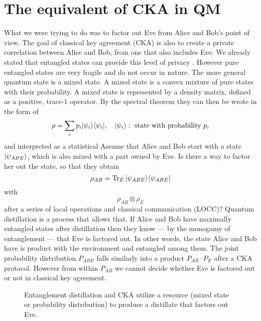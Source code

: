 	
    
\section{The equivalent of CKA in QM}
	What we were trying to do was to factor out Eve from Alice and Bob's point of view.
	The goal of classical key agreement (CKA) is also to create a private correlation between Alice and Bob, from one that also includes Eve.
	We already stated that entangled states can provide this level of privacy \cite{Ekert91}.
	However pure entangled states are very fragile and do not occur in nature.
	The more general quantum state is a mixed state.
	A mixed state is a convex mixture of pure states with their probability.
	A mixed state is represented by a density matrix, defined as a positive, trace-$1$ operator.
	By the spectral theorem they can then be wrote in the form of
	\begin{equation}
		\rho = \sum_i p_i |\psi_i \rangle\langle \psi_i| ,\quad |\psi_i \rangle: \text{ state with probability } p_i
	\end{equation}
	and interpreted as a statistical 
	Assume that Alice and Bob start with a state $|\psi_{ABE} \rangle$, which is also mixed with a part owned by Eve. 
	Is there a way to factor her out the state, so that they obtain
	\begin{equation}
		\rho_{AB} = \operatorname{Tr}_E |\psi_{ABE} \rangle\langle \psi_{ABE}|
	\end{equation}
	with
	\begin{equation}
		\rho_{AB}\otimes\rho_E
	\end{equation}
	after a series of local operations and classical communication (LOCC)?
	Quantum distillation is a process that allows that. \label{distillation}
	If Alice and Bob have maximally entangled states after distillation then they know --- by the monogamy of entanglement --- that Eve is factored out.
	In other words, the state Alice and Bob have is product with the environment and entangled among them.
	The joint probability distribution $P_{ABE}$ falls similarly into a product $P_{AB}\cdot P_E$ after a CKA protocol.
	However from within $P_{AB}$ we cannot decide whether Eve is factored out or not in classical key agreement.
    
    \begin{figure}[h]
    	\centering
    	
    	\caption{Entanglement distillation and CKA utilize a resource (mixed state or probability distribution) to produce a distillate that factors out Eve.}
    	\label{Fig:intuition}
    \end{figure}
    
